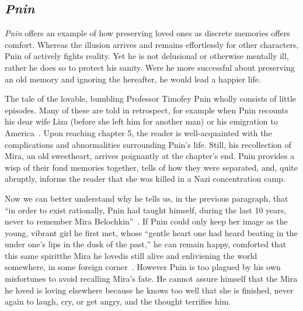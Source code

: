 \subsection{\emph{Pnin}}

\emph{Pnin} offers an example of how preserving loved ones as discrete memories offers comfort.
Whereas the illusion arrives and remains effortlessly for other characters, Pnin of actively fights reality.
Yet he is not delusional or otherwise mentally ill, rather he does so to protect his sanity.
Were he more successful about preserving an old memory and ignoring the hereafter, he would lead a happier life.

The tale of the lovable, bumbling Professor Timofey Pnin wholly consists of little episodes.
Many of these are told in retrospect, for example when Pnin recounts his dear wife Liza (before she left him for another man) or his emigration to America~\cite{pnin}.
Upon reaching chapter 5, the reader is well-acquainted with the complications and abnormalities surrounding Pnin's life.
Still, his recollection of Mira, an old sweetheart, arrives poignantly at the chapter's end.
Pnin provides a wisp of their fond memories together, tells of how they were separated, and, quite abruptly, informs the reader that she was killed in a Nazi concentration camp.

Now we can better understand why he tells us, in the previous paragraph, that ``in order to exist rationally, Pnin had taught himself, during the last 10 years, never to remember Mira Belochkin''~\cite[99]{pnin}.
If Pnin could only keep her image as the young, vibrant girl he first met, whose ``gentle heart one had heard beating in the under one's lips in the dusk of the past,'' he can remain happy, comforted that this same spirit\textemdash the Mira he loved\textemdash is still alive and enliviening the world somewhere, in some foreign corner~\cite[100]{pnin}.
However Pnin is too plagued by his own misfortunes to avoid recalling Mira's fate.
He cannot assure himself that the Mira he loved is loving elsewhere because he knows too well that she is finished, never again to laugh, cry, or get angry, and the thought terrifies him.

